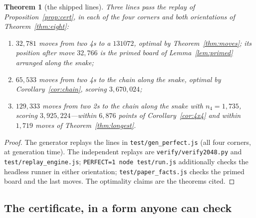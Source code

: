 \documentclass[11pt]{article}
\newtheorem{theorem}{Theorem}
\theoremstyle{definition}
\theoremstyle{remark}
\newcommand{\nfour}{n_4}
\begin{document}
\begin{theorem}[the shipped lines]\label{thm:lines}
Three lines pass the replay of Proposition~\ref{prop:cert}, in each of the
four corners and both orientations of Theorem~\ref{thm:eight}:
\begin{enumerate}[nosep,label=(\alph*)]
\item $32{,}781$ moves from two 4s to a $131072$, optimal by
Theorem~\ref{thm:moves}; its position after move $32{,}766$ is the primed
board of Lemma~\ref{lem:primed} arranged along the snake;
\item $65{,}533$ moves from two 4s to the chain along the snake, optimal
by Corollary~\ref{cor:chain}, scoring $3{,}670{,}024$;
\item $129{,}333$ moves from two 2s to the chain along the snake with
$\nfour=1{,}735$, scoring $3{,}925{,}224$---within $6{,}876$ points of
Corollary~\ref{cor:4x4} and within $1{,}719$ moves of
Theorem~\ref{thm:longest}.
\end{enumerate}
\end{theorem}
\begin{proof}
The generator replays the lines in \texttt{test/gen\_perfect.js}
(all four corners, at generation time). The independent replays are
\texttt{verify/verify2048.py} and \texttt{test/replay\_engine.js};
\texttt{PERFECT=1 node test/run.js} additionally checks the headless
runner in either orientation; \texttt{test/paper\_facts.js}
checks the primed board and the last moves. The optimality claims are the
theorems cited.
\end{proof}

\subsection{The certificate, in a form anyone can check}\label{sec:certificate}
\end{document}
